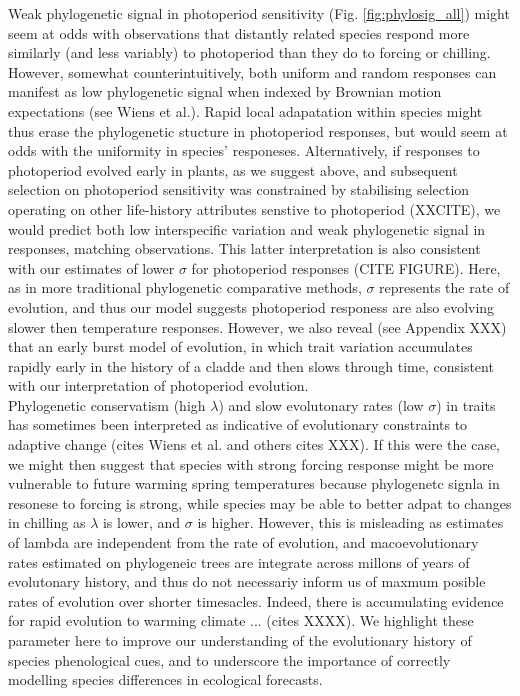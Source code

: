 \documentclass{article}\usepackage[]{graphicx}\usepackage[]{color}
\begin{document}
Weak phylogenetic signal in photoperiod sensitivity (Fig. \ref{fig:phylosig_all}) might seem at odds with observations that distantly related species respond more similarly (and less variably) to photoperiod than they do to forcing or chilling. However, somewhat counterintuitively, both uniform and random responses can manifest as low phylogenetic signal when indexed by Brownian motion expectations (see Wiens et al.). Rapid local adapatation within species might thus erase the phylogenetic stucture in photoperiod responses, but would seem at odds with the uniformity in species' responeses. Alternatively, if responses to photoperiod evolved early in plants, as we suggest above, and subsequent selection on photoperiod sensitivity was constrained by stabilising selection operating on other life-history attributes senstive to photoperiod (XXCITE), we would predict both low interspecific variation and weak phylogenetic signal in responses, matching observations. This latter interpretation is also consistent with our estimates of lower $\sigma$ for photoperiod responses (CITE FIGURE). Here, as in more traditional phylogenetic comparative methods, $\sigma$ represents the rate of evolution, and thus our model suggests photoperiod responess are also evolving slower then temperature responses. However, we also reveal (see Appendix XXX) that an early burst model of evolution, in which trait variation accumulates rapidly early in the history of a cladde and then slows through time, consistent with our interpretation of photoperiod evolution.
\\


Phylogenetic conservatism (high $\lambda$) and slow evolutonary rates (low $\sigma$) in traits has sometimes been interpreted as indicative of evolutionary constraints to adaptive change (cites Wiens et al. and others cites XXX). If this were the case, we might then suggest that species with strong forcing response might be more vulnerable to future warming spring temperatures because phylogenetc signla in resonese to forcing is strong, while species may be able to better adpat to changes in chilling as $\lambda$ is lower, and $\sigma$ is higher. However, this is misleading as estimates of lambda are independent from the rate of evolution, and macoevolutionary rates estimated on phylogeneic trees are integrate across millons of years of evolutonary history, and thus do not necessariy inform us of maxmum posible rates of evolution over shorter timesacles. Indeed, there is accumulating evidence for rapid evolution to warming climate ... (cites XXXX). We highlight these parameter here to improve our understanding of the evolutionary history of species phenological cues, and to underscore the importance of correctly modelling species differences in ecological forecasts. 
\\
\end{document}
